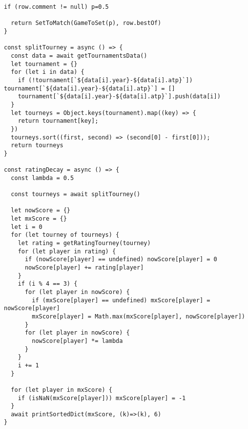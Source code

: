 \begin{lstlisting}[frame=single,breaklines]
  if (row.comment != null) p=0.5

  return SetToMatch(GameToSet(p), row.bestOf)
}

const splitTourney = async () => {
  const data = await getTournamentsData()
  let tournament = {}
  for (let i in data) {
    if (!tournament[`${data[i].year}-${data[i].atp}`]) tournament[`${data[i].year}-${data[i].atp}`] = []
    tournament[`${data[i].year}-${data[i].atp}`].push(data[i])
  }
  let tourneys = Object.keys(tournament).map((key) => {
    return tournament[key];
  })
  tourneys.sort((first, second) => (second[0] - first[0]));
  return tourneys
}

const ratingDecay = async () => {
  const lambda = 0.5

  const tourneys = await splitTourney()

  let nowScore = {}
  let mxScore = {}
  let i = 0
  for (let tourney of tourneys) {
    let rating = getRatingTourney(tourney)
    for (let player in rating) {
      if (nowScore[player] == undefined) nowScore[player] = 0
      nowScore[player] += rating[player]
    }
    if (i % 4 == 3) {
      for (let player in nowScore) {
        if (mxScore[player] == undefined) mxScore[player] = nowScore[player]
        mxScore[player] = Math.max(mxScore[player], nowScore[player])
      }
      for (let player in nowScore) {
        nowScore[player] *= lambda
      }
    }
    i += 1
  }

  for (let player in mxScore) {
    if (isNaN(mxScore[player])) mxScore[player] = -1
  }
  await printSortedDict(mxScore, (k)=>(k), 6)
}

\end{lstlisting}